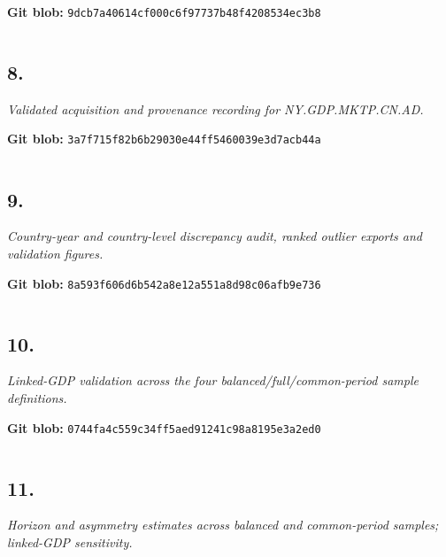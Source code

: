 \documentclass[10pt]{article}
\begin{document}
\noindent\textbf{Git blob:} \texttt{9dcb7a40614cf000c6f97737b48f4208534ec3b8}

\inputminted[linenos,fontsize=\scriptsize,breaklines,breakanywhere]{stata}{replication/validate_nominal_gdp_linked.do}


\clearpage
\subsection*{8. \texttt{}}
\textit{Validated acquisition and provenance recording for NY.GDP.MKTP.CN.AD.}

\noindent\textbf{Git blob:} \texttt{3a7f715f82b6b29030e44ff5460039e3d7acb44a}

\inputminted[linenos,fontsize=\scriptsize,breaklines,breakanywhere]{powershell}{replication/download_linked_nominal_gdp.ps1}


\clearpage
\subsection*{9. \texttt{}}
\textit{Country-year and country-level discrepancy audit, ranked outlier exports and validation figures.}

\noindent\textbf{Git blob:} \texttt{8a593f606d6b542a8e12a551a8d98c06afb9e736}

\inputminted[linenos,fontsize=\scriptsize,breaklines,breakanywhere]{stata}{replication/audit_nominal_gdp_linked.do}


\clearpage
\subsection*{10. \texttt{}}
\textit{Linked-GDP validation across the four balanced/full/common-period sample definitions.}

\noindent\textbf{Git blob:} \texttt{0744fa4c559c34ff5aed91241c98a8195e3a2ed0}

\inputminted[linenos,fontsize=\scriptsize,breaklines,breakanywhere]{stata}{replication/validate_balanced_panel_samples.do}


\clearpage
\subsection*{11. \texttt{}}
\textit{Horizon and asymmetry estimates across balanced and common-period samples; linked-GDP sensitivity.}
\end{document}

